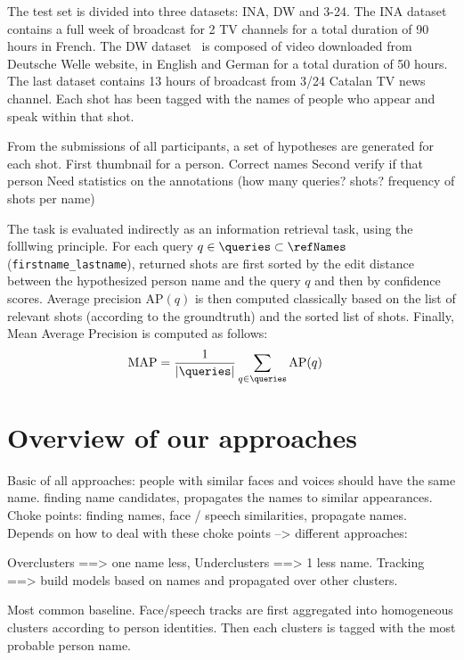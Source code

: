  The test set is divided into three datasets: INA, DW and 3-24. The INA dataset contains a full week of broadcast for 2 TV channels for a total duration of 90 hours in French. The DW dataset~\cite{EUMSSI} is composed of video downloaded from Deutsche Welle website, in English and German for a total duration of 50 hours. The last dataset contains 13 hours of broadcast from 3/24 Catalan TV news channel. Each shot has been tagged with the names of people who appear and speak within that shot.
%

From the submissions of all participants, a set of hypotheses are generated for each shot. 
%
First thumbnail for a person. Correct names 
%
Second verify if that person 
%
Need statistics on the annotations (how many queries? shots? frequency of shots per name)

 The task is evaluated indirectly as an information retrieval task, using the folllwing principle.
%
For each query $q \in \queries \subset \refNames$ (\texttt{first\-name\_lastname}), returned shots are first sorted by the edit distance between the hypothesized person name and the query $q$ and then by confidence scores.
Average precision $\text{AP}(q)$ is then computed classically based on the list of relevant shots (according to the groundtruth) and the sorted list of shots. Finally, Mean Average Precision is computed as follows:
\begin{align}
            \text{MAP} & = \frac{1}{|\queries|} \sum_{q \in \queries} \text{AP}(q) \nonumber
\end{align}


\section{Overview of our approaches}
\label{sec:overview}

Basic of all approaches: people with similar faces and voices should have the same name. finding name candidates, propagates the names to similar appearances. Choke points: finding names, face / speech similarities, propagate names. Depends on how to deal with these choke points --> different approaches:

Overclusters ==> one name less, Underclusters ==> 1 less name. Tracking ==> build models based on names and propagated over other clusters. 

Most common baseline. Face/speech tracks are first aggregated into homogeneous clusters according to person identities. Then each clusters is tagged with the most probable person name.

